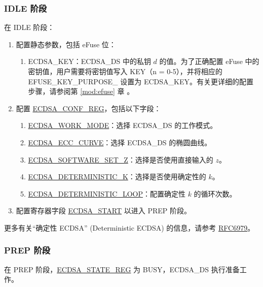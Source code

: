 \documentclass[main\_\_CN.tex]{subfiles}
\begin{document}
\subsubsection{IDLE 阶段}
在 IDLE 阶段：
\begin{enumerate}
	\item 配置静态参数，包括 eFuse 位：
	      \begin{enumerate}
		      \item ECDSA\_KEY：ECDSA\_DS 中的私钥 $d$ 的值。为了正确配置 eFuse 中的密钥值，用户需要将密钥值写入 KEY（n = 0-5），并将相应的 EFUSE\_KEY\_PURPOSE\_ 设置为 ECDSA\_KEY。有关更详细的配置步骤，请参阅第 \ref{mod:efuse} 章 \textit{}。
	      \end{enumerate}
	\item 配置 \hyperref[regdesc:ECDSACONFREG]{ECDSA\_CONF\_REG}，包括以下字段：
	      \begin{enumerate}
		      \item \hyperref[fielddesc:ECDSAWORKMODE]{ECDSA\_WORK\_MODE}：选择 ECDSA\_DS 的工作模式。
		      \item \hyperref[fielddesc:ECDSAECCCURVE]{ECDSA\_ECC\_CURVE}：选择 ECDSA\_DS 的椭圆曲线。
		      \item \hyperref[fielddesc:ECDSASOFTWARESETZ]{ECDSA\_SOFTWARE\_SET\_Z}：选择是否使用直接输入的 $z$。
		    \item \hyperref[fielddesc:ECDSADETERMINISTICK]{ECDSA\_DETERMINISTIC\_K}：选择是否使用确定性的 $k$。
	        \item \hyperref[fielddesc:ECDSADETERMINISTICLOOP]{ECDSA\_DETERMINISTIC\_LOOP}：配置确定性 $k$ 的循环次数。
	      \end{enumerate}
	\item 配置寄存器字段 \hyperref[fielddesc:ECDSASTART]{ECDSA\_START} 以进入 PREP 阶段。
\end{enumerate}

\begin{tiplisting}
更多有关“确定性 ECDSA” (Deterministic ECDSA) 的信息，请参考 \href{https://www.rfc-editor.org/rfc/rfc6979}{RFC6979}。
\end{tiplisting}

\subsubsection{PREP 阶段}

在 PREP 阶段，\hyperref[regdesc:ECDSASTATEREG]{ECDSA\_STATE\_REG} 为 BUSY，ECDSA\_DS 执行准备工作。
\end{document}
